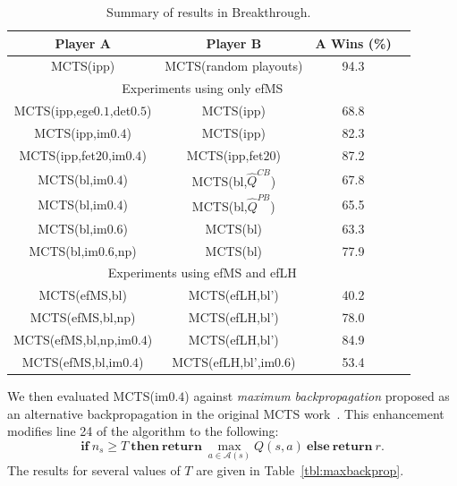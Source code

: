 \documentclass{article}
\newcommand{\cA}{\mathcal{A}}
\newcommand{\hQ}{\hat{Q}}
\begin{document}
\begin{table}[t!]
\begin{center}
\begin{tabular}{|c|c|c|c|}
\hline
{\bf Player A}              & {\bf Player B}         & {\bf A Wins} (\%)  \\
\hline
MCTS(ipp)                   & MCTS(random playouts)  & 94.3               \\
\hline 
\hline 
\multicolumn{3}{|c|}{Experiments using only efMS}  \\ 
\hline
MCTS(ipp,ege$0.1$,det$0.5$) & MCTS(ipp)              & 68.8               \\
MCTS(ipp,im$0.4$)           & MCTS(ipp)              & 82.3               \\ 
MCTS(ipp,fet$20$,im$0.4$)   & MCTS(ipp,fet$20$)      & 87.2               \\
MCTS(bl,im$0.4$)            & MCTS(bl,$\hQ^{CB}$)    & 67.8               \\
MCTS(bl,im$0.4$)            & MCTS(bl,$\hQ^{PB}$)    & 65.5               \\
MCTS(bl,im$0.6$)            & MCTS(bl)               & 63.3               \\
MCTS(bl,im$0.6$,np)         & MCTS(bl)               & 77.9               \\
\hline
\hline
\multicolumn{3}{|c|}{Experiments using efMS and efLH}  \\ 
\hline
MCTS(efMS,bl)               & MCTS(efLH,bl')         & 40.2               \\
MCTS(efMS,bl,np)            & MCTS(efLH,bl')         & 78.0               \\
MCTS(efMS,bl,np,im$0.4$)    & MCTS(efLH,bl')         & 84.9               \\ 
MCTS(efMS,bl,im$0.4$)       & MCTS(efLH,bl',im$0.6$) & 53.4               \\
\hline
\end{tabular}
\end{center}
\caption{Summary of results in Breakthrough.}
\label{tbl:btsummary}
\end{table}


We then evaluated MCTS(im$0.4$) against {\it maximum backpropagation} proposed as an alternative 
backpropagation in the original MCTS work~\cite{Coulom06Efficient}. This enhancement
modifies line 24 of the algorithm to the following: 
\[
\mathbf{if}~n_{s} \ge T~\mathbf{then~return}~\max_{a \in \cA(s)} Q(s,a)~\mathbf{else~return}~r.
\]
The results for several values of $T$ are given in Table~\ref{tbl:maxbackprop}. 
\end{document}

